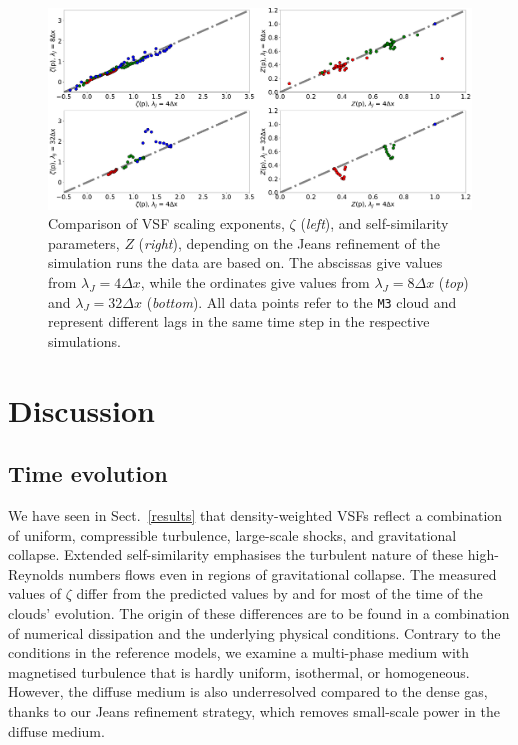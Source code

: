 \documentclass{aa}		%
\begin{document}
\begin{figure}
	\centering
    \includegraphics[width=\textwidth]{comp_jeans.pdf}
    \caption{Comparison of VSF scaling exponents, $\zeta$ (\textit{left}), and self-similarity parameters, $Z$ (\textit{right}), depending on the Jeans refinement of the simulation runs the data are based on. The abscissas give values from $\lambda_J = 4\Delta{}x$, while the ordinates give values from $\lambda_J = 8\Delta{}x$ (\textit{top}) and $\lambda_J = 32\Delta{}x$ (\textit{bottom}). All data points refer to the \texttt{M3} cloud and represent different lags in the same time step in the respective simulations. 
    }
    \label{pic:results:jeans_comp}
\end{figure}



\section{Discussion}\label{discussion}

\subsection{Time evolution}\label{discussion:normal}

We have seen in Sect.~\ref{results} that density-weighted VSFs reflect a combination of uniform, compressible turbulence, large-scale shocks, and gravitational collapse.  Extended self-similarity emphasises the turbulent nature of these high-Reynolds numbers flows even in regions of gravitational collapse. 
The measured values of $\zeta$ differ from the predicted values by \citet{She1994} and \citet{Boldyrev2002} for most of the time of the clouds' evolution.
The origin of these differences are to be found in a combination of numerical dissipation and the underlying physical conditions. 
Contrary to the conditions in the reference models, we examine a multi-phase medium with magnetised turbulence that is hardly uniform, isothermal, or homogeneous.
However, the diffuse medium is also underresolved compared to the dense gas, thanks to our Jeans refinement strategy, which removes small-scale power in the diffuse medium.
\end{document}
